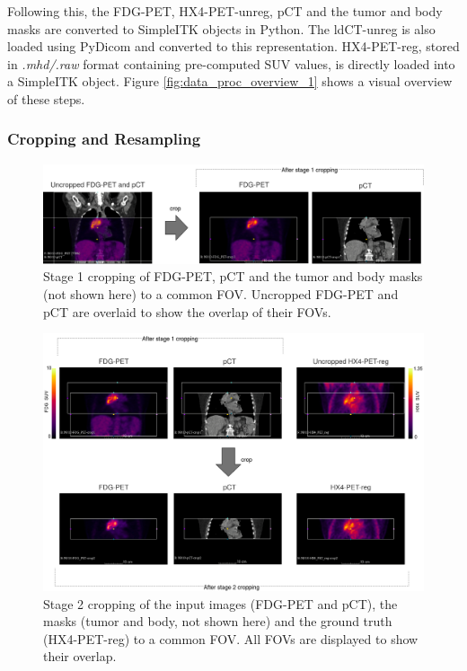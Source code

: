 Following this, the FDG-PET, HX4-PET-unreg, pCT and the tumor and body masks are converted to SimpleITK objects in Python. The ldCT-unreg is also loaded using PyDicom and converted to this representation. HX4-PET-reg, stored in \textit{.mhd/.raw} format containing pre-computed SUV values, is directly loaded into a SimpleITK object. Figure \ref{fig:data_proc_overview_1} shows a visual overview of these steps.


\subsubsection{Cropping and Resampling}
\begin{figure}[h!]
    \centering
    \includegraphics[width=\linewidth]{figures/Data/fdgpet_pct_crop1/N010-FDG_PET_pCT-uncropped_crop1.png}
    \caption{Stage 1 cropping of FDG-PET, pCT and the tumor and body masks (not shown here) to a common FOV. Uncropped FDG-PET and pCT are overlaid to show the overlap of their FOVs.}
    \label{fig:fdg_pet_pct_crop1}
\end{figure}

\begin{figure}[h!]
    \centering
    \includegraphics[width=\linewidth]{figures/Data/fdgpet_pct_hx4petreg_crop2/N010-fdgpet_pct_hx4petreg-uncropped_crop2.png}
    \caption{Stage 2 cropping of the input images (FDG-PET and pCT), the masks (tumor and body, not shown here) and the ground truth (HX4-PET-reg) to a common FOV. All FOVs are displayed to show their overlap.}
    \label{fig:fdgpet_pct_hx4petreg_crop2}
\end{figure}

